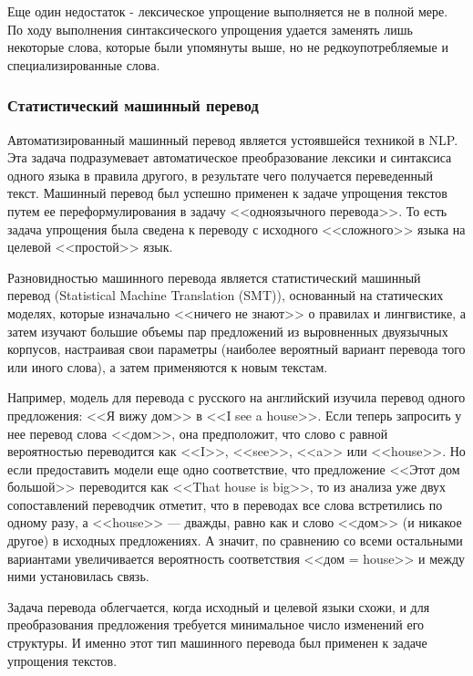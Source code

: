 Еще один недостаток -  лексическое упрощение выполняется не в полной мере. По ходу выполнения синтаксического упрощения удается заменять лишь некоторые слова, которые были упомянуты выше, но не редкоупотребляемые и специализированные слова.


\subsubsection{Статистический машинный перевод}
Автоматизированный машинный перевод является устоявшейся техникой в NLP. Эта задача подразумевает автоматическое преобразование лексики и синтаксиса одного языка в правила другого, в результате чего получается переведенный текст. Машинный перевод был успешно применен\cite{shardlow_survey_2014} к задаче упрощения текстов путем ее переформулирования в задачу <<одноязычного перевода>>. То есть задача упрощения была сведена к переводу с исходного <<сложного>> языка на целевой <<простой>> язык.

Разновидностью машинного перевода является статистический машинный перевод (Statistical Machine Translation (SMT)), основанный на статических моделях, которые изначально <<ничего не знают>> о правилах и лингвистике, а затем изучают большие объемы пар предложений из выровненных двуязычных корпусов, настраивая свои параметры (наиболее вероятный вариант перевода того или иного слова), а затем применяются к новым текстам. 

Например, модель для перевода с русского на английский изучила перевод одного предложения: <<Я вижу дом>> в <<I see a house>>. Если теперь запросить у нее перевод слова <<дом>>, она предположит, что слово с равной вероятностью переводится как <<I>>, <<see>>, <<a>> или <<house>>. Но если предоставить модели еще одно соответствие, что предложение <<Этот дом большой>> переводится как <<That house is big>>, то из анализа уже двух сопоставлений переводчик отметит, что в переводах все слова встретились по одному разу, а <<house>> — дважды, равно как и слово <<дом>> (и никакое другое) в исходных предложениях. А значит, по сравнению со всеми остальными вариантами увеличивается вероятность соответствия <<дом = house>> и между ними установилась связь. 

Задача перевода облегчается, когда исходный и целевой языки схожи, и для преобразования предложения требуется минимальное число изменений его структуры. И именно этот тип машинного перевода был применен к задаче упрощения текстов\cite{shardlow_survey_2014}.



